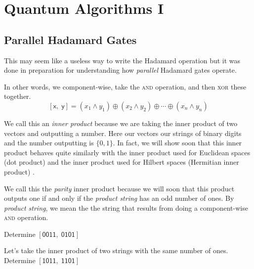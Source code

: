 
\chapter{Quantum Algorithms I}


\section{Parallel Hadamard Gates}



This may seem like a useless way to write the Hadamard operation but it was done in preparation 
for understanding how \textit{parallel} Hadamard gates operate. 




In other words, we component-wise, take the \textsc{and} operation, and then \textsc{xor} these together.
$$[\textsf{x}, \; \textsf{y}] = (x_1 \wedge y_1) \oplus (x_2 \wedge y_2) \oplus \dotsm \oplus (x_n \wedge y_n)$$

We call this an \textit{inner product} because we are taking the inner product 
of two vectors and outputting a number. Here our vectors our strings of binary digits
and the number outputting is $\{0,1\}$. In fact, we will show soon that this 
inner product behaves quite similarly with the inner product used for Euclidean spaces (dot product) 
and the inner product used for Hilbert spaces (Hermitian inner product) .

We call this the \textit{parity} inner product because we will soon that this product 
outputs one if and only if the \textit{product string} has an odd number of ones.
By \textit{product string}, we mean the the string that results 
from doing a component-wise \textsc{and} operation.

\frmrule

\begin{example}
Determine $[\textsf{0011}, \; \textsf{0101}]$ 
\end{example}



\frmrule


\begin{example}
Let's take the inner product of two strings with the same number of ones.  \\
Determine $[\textsf{1011}, \; \textsf{1101}]$ 
\end{example}


